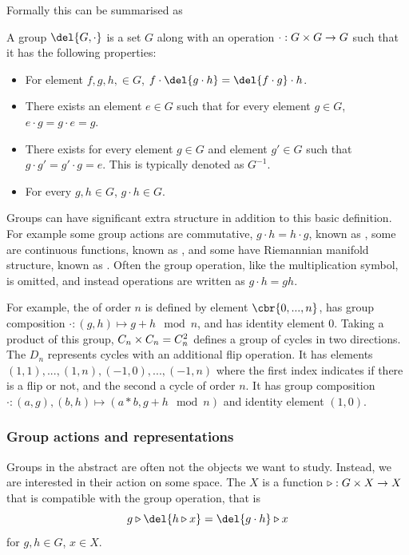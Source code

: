 Formally this can be summarised as
\begin{definition}[Group]
	A group \(\del{G, \cdot}\) is a set \(G\) along with an operation \(\cdot: G\times G \to G\) such that it has the following properties:
	\begin{itemize}[leftmargin=1in]
		\item[\emph{Associativity}] For element \(f,g,h, \in G\), \( f\cdot \del{g \cdot h} = \del{f \cdot g} \cdot h\).
		\item[\emph{Identity}] There exists an element \(e \in G\) such that for every element \(g\in G\), \(e \cdot g = g \cdot e = g\). 
		\item[\emph{Invertibility}] There exists for every element \(g\in G\) and element \(g'\in G\) such that \(g \cdot g' = g' \cdot g = e\). This is typically denoted as \(G^{-1}\). 
		\item[\emph{Closure}] For every \(g, h\in G\), \(g \cdot h \in G\).
	\end{itemize}
\end{definition}
Groups can have significant extra structure in addition to this basic definition.
For example some group actions are commutative, \(g \cdot h = h \cdot g\), known as , some are continuous functions, known as , and some have Riemannian manifold structure, known as .
Often the group operation, like the multiplication symbol, is omitted, and instead operations are written as \(g\cdot h = gh\).

For example, the  of order \(n\) is defined by element \(\cbr{0, ..., n}\), has group composition \(\cdot: (g, h) \mapsto g + h \mod n\), and has identity element \(0\).
Taking a product of this group, \(C_n \times C_n = C_n^2\) defines a group of cycles in two directions.
The  \(D_n\) represents cycles with an additional flip operation. It has elements \((1, 1), ..., (1, n), (-1, 0), ..., (-1, n)\) where the first index indicates if there is a flip or not, and the second a cycle of order \(n\). 
It has group composition \(\cdot: (a, g), (b, h) \mapsto (a*b, g+h \mod n)\) and identity element \((1, 0)\).


\subsubsection{Group actions and representations}

Groups in the abstract are often not the objects we want to study.
Instead, we are interested in their action on some space.
The  \(X\) is a function \(\triangleright: G \times X \to X\) that is compatible with the group operation, that is 
\[g \triangleright \del{h \triangleright x} = \del{g \cdot h} \triangleright x\]
for \(g, h \in G\), \(x \in X\).

